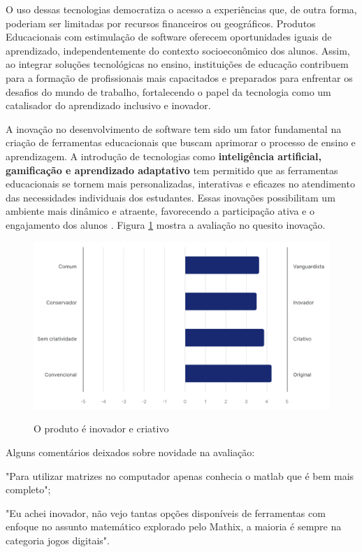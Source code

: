 O uso dessas tecnologias democratiza o acesso a experiências que, de outra forma, poderiam ser limitadas por recursos financeiros ou geográficos. Produtos Educacionais com estimulação de software oferecem oportunidades iguais de aprendizado, independentemente do contexto socioeconômico dos alunos. Assim, ao integrar soluções tecnológicas no ensino, instituições de educação contribuem para a formação de profissionais mais capacitados e preparados para enfrentar os desafios do mundo de trabalho, fortalecendo o papel da tecnologia como um catalisador do aprendizado inclusivo e inovador.

A inovação no desenvolvimento de software tem sido um fator fundamental na criação de ferramentas educacionais que buscam aprimorar o processo de ensino e aprendizagem. A introdução de tecnologias como \textbf{inteligência artificial, gamificação e aprendizado adaptativo} tem permitido que as ferramentas educacionais se tornem mais personalizadas, interativas e eficazes no atendimento das necessidades individuais dos estudantes. Essas inovações possibilitam um ambiente mais dinâmico e atraente, favorecendo a participação ativa e o engajamento dos alunos \cite{santos2022inovacao}. Figura \ref{fig:ux-9} mostra a avaliação no quesito inovação.

\begin{figure}[h!]
    \caption{O produto é inovador e criativo}
    \centering
    \includegraphics[scale=0.4]{figuras/resultados/ux-9.png}
    \label{fig:ux-9}
\end{figure}

Alguns comentários deixados sobre novidade na avaliação:
\begin{citacao}
\item "Para utilizar matrizes no computador apenas conhecia o matlab que é bem mais completo";
\item "Eu achei inovador, não vejo tantas opções disponíveis de ferramentas com enfoque no assunto matemático explorado pelo Mathix, a maioria é sempre na categoria jogos digitais".
\end{citacao}

